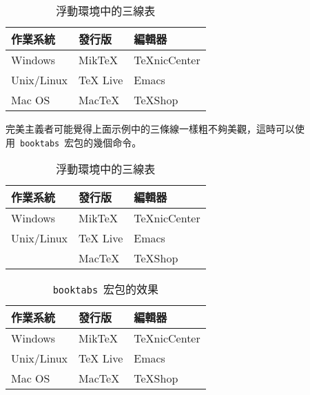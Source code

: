 \begin{table}[htbp]
\caption{浮動環境中的三線表}
\label{tab:threesome}
\centering
\begin{tabular}{lll}
    \hline 
    作業系統 & 發行版 & 編輯器 \\
    \hline 
    Windows & MikTeX & TeXnicCenter \\
    Unix/Linux & TeX Live & Emacs \\
    Mac OS & MacTeX & TeXShop \\
    \hline 
\end{tabular}
\end{table}

完美主義者可能覺得上面示例中的三條線一樣粗不夠美觀，這時可以使用~\verb|booktabs|~宏包\citep{Fear_2005}的幾個命令。

\begin{code}
\begin{table}[htbp]
\caption{浮動環境中的三線表}
\centering
\begin{tabular}{lll}
    \toprule
    作業系統 & 發行版 & 編輯器 \\
    \midrule
    Windows & MikTeX & TeXnicCenter \\
    Unix/Linux & TeX Live & Emacs \\
\end{code}

\begin{code}
    Mac OS & MacTeX & TeXShop \\
    \bottomrule
\end{tabular}
\end{table}
\end{code}

\begin{table}[htbp]
\caption{\texttt{booktabs}~宏包的效果}
\centering
\begin{tabular}{lll}
    \toprule
    作業系統 & 發行版 & 編輯器 \\
    \midrule
    Windows & MikTeX & TeXnicCenter \\
    Unix/Linux & TeX Live & Emacs \\
    Mac OS & MacTeX & TeXShop \\
    \bottomrule
\end{tabular}
\end{table}

